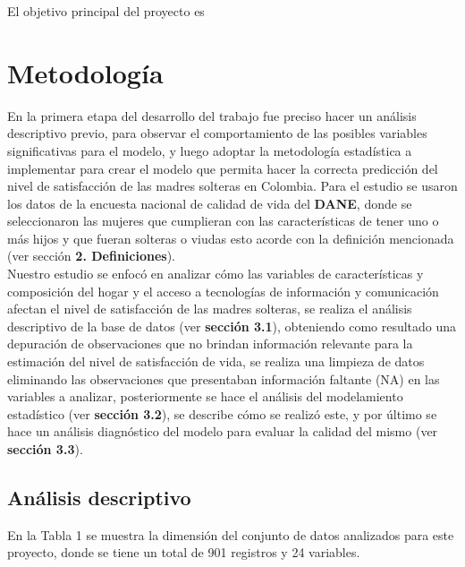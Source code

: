 \documentclass[11pt,twoside]{article}
\begin{document}
El objetivo principal del proyecto es 





\section{Metodología}
\noindent
En la primera etapa del desarrollo del trabajo fue preciso hacer un análisis descriptivo previo, para observar el comportamiento de las posibles variables significativas para el modelo, y luego adoptar la metodología estadística a implementar para crear el modelo que permita hacer la correcta predicción del nivel de satisfacción de las madres solteras en Colombia. Para el estudio se usaron los datos de la encuesta nacional de calidad de vida del \textbf{DANE}, donde se seleccionaron las mujeres que cumplieran con las características de tener uno o más hijos y que fueran solteras o viudas esto acorde con la definición mencionada (ver sección \textbf{2. Definiciones}).
\\
Nuestro estudio se enfocó en analizar cómo las variables de características y composición del hogar y el acceso a tecnologías de información y comunicación afectan el nivel  de satisfacción de las madres solteras, se  realiza el análisis descriptivo de la base de datos (ver \textbf{sección 3.1}), obteniendo como resultado una depuración de observaciones que no brindan información relevante para la estimación del nivel de satisfacción de vida, se realiza una limpieza de datos eliminando las observaciones que presentaban información faltante (NA) en las variables a analizar, posteriormente se hace el análisis del modelamiento estadístico (ver \textbf{sección 3.2}), se describe cómo se realizó este, y por último se hace un análisis diagnóstico del modelo para evaluar la calidad del mismo (ver \textbf{sección 3.3}).
\subsection{Análisis descriptivo}
\noindent
En la Tabla 1 se muestra la dimensión del conjunto de datos analizados para este proyecto, donde se tiene un total de 901 registros y 24 variables.
\begin{table}[H]
	\caption{\small{Dimensión de la base de datos.}}
	\label{tabla1}
\end{table}
\end{document}
